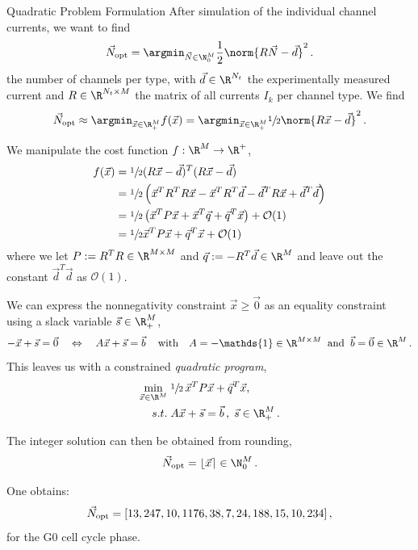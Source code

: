 \documentclass[aspectratio=169, hyperref={colorlinks=true}]{beamer}
\begin{document}
  \begin{frame}[allowframebreaks]{Quadratic Problem Formulation}
    After simulation of the individual channel currents, we want to find
    \begin{equation*}
      \vec{N}_{\rm opt} = \argmin_{\vec{N} \in \N_0^M} \frac{1}{2} \norm{R \vec{N} - \vec{d}}^2\,.
      \label{eq:minimization}
    \end{equation*}
    the number of channels per type, with $\vec{d} \in \R^{N_t}$ the experimentally measured current and $R \in \R^{N_t \times M}$ the matrix of all currents $I_k$ per channel type.
    We find
    $$\vec{N}_{\rm opt} \approx \argmin_{\vec{x} \in \R_+^M} f(\vec{x}) = \argmin_{\vec{x} \in \R_+^M} \sfrac{1}{2} \norm{R \vec{x} - \vec{d}}^2\,.$$

    We manipulate the cost function $f: \R^M \to \R^+$,
    \begin{align*}
      f(\vec{x}) & = \sfrac{1}{2} (R \vec{x} - \vec{d})^T (R \vec{x} - \vec{d})                                                          \\
                 & = \sfrac{1}{2} \left(\vec{x}^T R^T R \vec{x} - \vec{x}^T R^T \vec{d} - \vec{d}^T R \vec{x} + \vec{d}^T \vec{d}\right) \\
                 & = \sfrac{1}{2} \left(\vec{x}^T P \vec{x} + \vec{x}^T \vec{q} + \vec{q}^T \vec{x}\right) + \mathcal{O}(1)              \\
                 & = \sfrac{1}{2} \vec{x}^T P \vec{x} + \vec{q}^T \vec{x} + \mathcal{O}(1)
    \end{align*}
    where we let $P := R^T R \in \R^{M \times M}$ and $\vec{q} := -R^T \vec{d} \in \R^M$ and leave out the constant $\vec{d}^T \vec{d}$ as $\mathcal{O}(1)$.

    We can express the nonnegativity constraint $\vec{x} \ge \vec{0}$ as an equality constraint using a slack variable $\vec{s} \in \R_+^M$,
    $$-\vec{x} + \vec{s} = \vec{0} \quad\Leftrightarrow\quad A \vec{x} + \vec{s} = \vec{b}\,\quad \text{with}\quad A = -\mathds{1} \in \R^{M \times M} \;\;\text{and}\;\; \vec{b} = \vec{0} \in \R^M\,.$$
    This leaves us with a constrained \textit{quadratic program},
    \begin{align*}
      \min_{\vec{x} \in \R^M}\; & \sfrac{1}{2}\, \vec{x}^T P \vec{x} + \vec{q}^T \vec{x},  \\
      s.t.\;                    & A \vec{x} + \vec{s} = \vec{b}\,,\; \vec{s} \in \R_+^M\,.
    \end{align*}


    The integer solution can then be obtained from rounding,
    $$\vec{N}_{\rm opt} = \lfloor \vec{x} \rceil \in \N_0^M\,.$$

    One obtains:
    $$\vec{N}_{\rm opt} = [13, 247, 10, 1176, 38, 7, 24, 188, 15, 10, 234]\,,$$
    for the G0 cell cycle phase.
  \end{frame}
\end{document}
